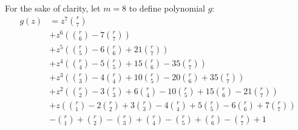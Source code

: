 For the sake of clarity, let $m=8$ to define polynomial $g$:
\begin{displaymath}
\begin{split}
g{\left (z \right )} &= z^{7} {\binom{r}{7}} \\
&+ z^{6} \left({\binom{r}{6}} - 7 {\binom{r}{7}}\right) \\
&+ z^{5} \left({\binom{r}{5}} - 6 {\binom{r}{6}} + 21 {\binom{r}{7}}\right) \\
&+ z^{4} \left({\binom{r}{4}} - 5 {\binom{r}{5}} + 15 {\binom{r}{6}} - 35 {\binom{r}{7}}\right) \\
&+ z^{3} \left({\binom{r}{3}} - 4 {\binom{r}{4}} + 10 {\binom{r}{5}} - 20 {\binom{r}{6}} + 35 {\binom{r}{7}}\right) \\
&+ z^{2} \left({\binom{r}{2}} - 3 {\binom{r}{3}} + 6 {\binom{r}{4}} - 10 {\binom{r}{5}} + 15 {\binom{r}{6}} - 21 {\binom{r}{7}}\right) \\
&+ z \left({\binom{r}{1}} - 2 {\binom{r}{2}} + 3 {\binom{r}{3}} - 4 {\binom{r}{4}} + 5 {\binom{r}{5}} - 6 {\binom{r}{6}} + 7 {\binom{r}{7}}\right) \\
&- {\binom{r}{1}} + {\binom{r}{2}} - {\binom{r}{3}} + {\binom{r}{4}} - {\binom{r}{5}} + {\binom{r}{6}} - {\binom{r}{7}} + 1 \\
\end{split}
\end{displaymath}

